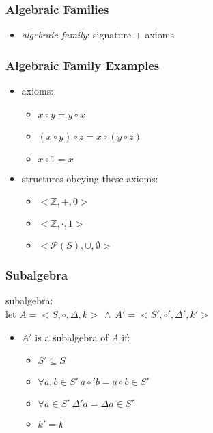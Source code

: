 \documentclass[dvipsnames]{beamer}
\begin{document}
\begin{frame}
  \frametitle{Algebraic Families}

  \begin{itemize}
    \item \emph{algebraic family}: signature + axioms
  \end{itemize}
\end{frame}

\begin{frame}
  \frametitle{Algebraic Family Examples}

  \begin{example}
    \begin{itemize}
      \item axioms:
      \begin{itemize}
        \item $x \circ y = y \circ x$
        \item $(x \circ y) \circ z = x \circ (y \circ z)$
        \item $x \circ 1 = x$
      \end{itemize}

      \pause
      \item structures obeying these axioms:
      \begin{itemize}
       \item $<\mathbb{Z},+,0>$
       \item $<\mathbb{Z},\cdot,1>$
       \item $<\mathcal{P}(S),\cup,\emptyset>$
      \end{itemize}
    \end{itemize}
  \end{example}
\end{frame}

\begin{frame}
  \frametitle{Subalgebra}

  \begin{definition}
    \alert{subalgebra}:\\
    let $A = <S,\circ,\Delta,k>~\wedge~A' = <S',\circ',\Delta',k'>$

    \pause
    \medskip
    \begin{itemize}
      \item $A'$ is a subalgebra of $A$ if:
      \begin{itemize}
        \item $S' \subseteq S$
        \item $\forall a,b \in S'~a \circ' b = a \circ b \in S'$
        \item $\forall a \in S'~\Delta' a = \Delta a \in S'$
        \item $k' = k$
      \end{itemize}
    \end{itemize}
  \end{definition}
\end{frame}
\end{document}
